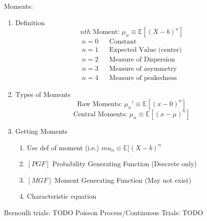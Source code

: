\documentclass[12pt]{article}
\renewcommand{\=}[1]{\stackrel{#1}{=}} %
\theoremstyle{definition}
\theoremstyle{remark}
\begin{document}
Moments:
\begin{enumerate}
\item Definition 
  \begin{equation}
  nth\textrm{ Moment: }\mu_n \equiv \mathbb{E}[(X-b)^n]
\end{equation}
\begin{align*}
  n = 0& & \textrm{Constant}\\
  n = 1& & \textrm{Expected Value (center)}\\
  n = 2& & \textrm{Measure of Dispersion}\\
  n = 3& & \textrm{Measure of asymmetry}\\
  n = 4& & \textrm{Measure of peakedness}
\end{align*}
\item Types of Moments
  \begin{equation}
    \textrm{Raw Moments: } \mu_n' \equiv \mathbb{E}[(x-0)^n]
  \end{equation}
  \begin{equation}
    \textrm{Central Moments: } \mu_n \equiv \mathbb{E}[(x-\mu)^n]
  \end{equation}
\item Getting Moments
  \begin{enumerate}
  \item Use def of moment (i.e.) $mu_n \equiv \mathbb{E}[(X-b)^n$
  \item $[PGF]$ Probability Generating Function (Descrete only)
  \item $[MGF]$ Moment Generating Function (May not exist)
    
  \item Characteristic equation
  \end{enumerate}
\end{enumerate}





Bernoulli trials: TODO
Poisson Process/Continuous Trials: TODO
\end{document}
